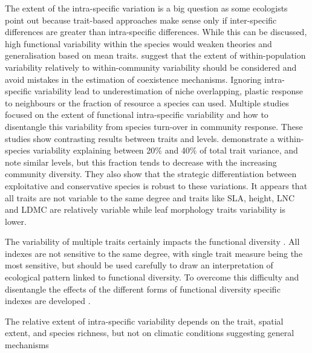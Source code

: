{The extent of the intra-specific variation is a big question as some ecologists point out because trait-based approaches make sense only if inter-specific differences are greater than intra-specific differences. While this can be discussed, high functional variability within the species would weaken theories and generalisation based on mean traits. \cite{violle_return_2012} suggest that the extent of within-population variability relatively to within-community variability should be considered and avoid mistakes in the estimation of coexistence mechanisms. Ignoring intra-specific variability lead to underestimation of niche overlapping, plastic response to neighbours or the fraction of resource a species can used. Multiple studies focused on the extent of functional intra-specific variability \parencite{albert_intraspecific_2010, albert_multi-trait_2010} and how to disentangle this variability from species turn-over \parencite{leps_community_2011} in community response. These studies show contrasting results between traits and levels. \cite{albert_multi-trait_2010} demonstrate a within-species variability explaining between 20\% and 40\% of total trait variance, and \cite{siefert_global_2015} note similar levels, but this fraction tends to decrease with the increasing community diversity. They also show that the strategic differentiation between exploitative and conservative species is robust to these variations. It appears that all traits are not variable to the same degree and traits like SLA, height, LNC and LDMC are relatively variable while leaf morphology traits variability is lower\cite{siefert_global_2015}. 

The variability of multiple traits certainly impacts the functional diversity \parencite{de_bello_quantifying_2011, albert_importance_2012}. All indexes are not sensitive to the same degree, with single trait measure being the most sensitive, but should be used carefully to draw an interpretation of ecological pattern linked to functional diversity. To overcome this difficulty and disentangle the effects of the different forms of functional diversity specific indexes are developed \parencite{de_bello_quantifying_2011}.

The relative extent of intra-specific variability depends on the trait, spatial extent, and species richness, but not on climatic conditions \parencite{siefert_global_2015} suggesting general mechanisms 
%
%
%

}
